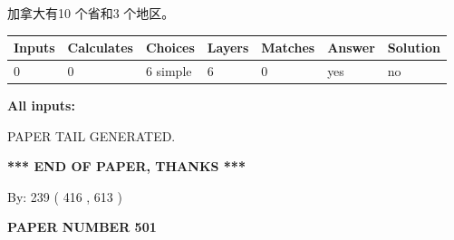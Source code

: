 \documentclass{ctexart}
\begin{document}
 
加拿大有10 个省和3 个地区。
 
 
\noindent{}
 
 
   
   
   
   
\noindent\begin{tabular}{|l|l|l|l|l|l|l|}
 \hline
Inputs & Calculates & Choices & Layers & Matches & Answer & Solution \\ \hline
 0  & 
 0  & 
 6
  simple  
  & 
 6  & 
 0  & 
  yes & 
  no 
  \\ \hline
 \end{tabular}
   
   
   
   
\noindent{}
   
   
   
   
\noindent\vspace{0.1in}\hspace{-0.08in} {\textbf{\Large{All inputs: }}}
   
   
   
   
   
   
 \vspace{0.2in}
 
   
   
\vspace{2.0in} PAPER TAIL GENERATED.
   
   
   
   
\vspace{1.0in} 
{\textbf{\large{ *** END OF PAPER, THANKS *** }}} 
   
   
\hspace{1.0in} By: 
 239 ( 416 ,  613 )
   
   
   
   
\newpage 
\setcounter{page}{ 
   501001 } 
   
   
   
   
 {\textbf{ \Large{ PAPER NUMBER  501  }}}
   
   
\vspace{0.2in}
   
   
   
   
   
   
   
\end{document}
